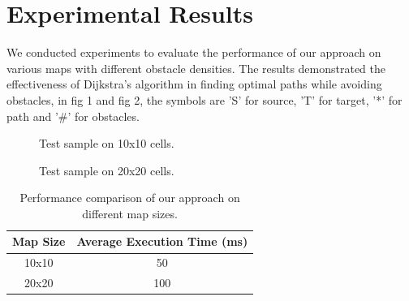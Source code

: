 \documentclass{article}
\begin{document}
\section{Experimental Results}
We conducted experiments to evaluate the performance of our approach on various maps with different obstacle densities. The results demonstrated the effectiveness of Dijkstra's algorithm in finding optimal paths while avoiding obstacles, in fig 1 and fig 2, the symbols are 'S' for source, 'T' for target, '*' for path and '\#' for obstacles.

\begin{figure}[H]
  \centering
  \caption{Test sample on 10x10 cells.}
  \label{fig:example1}
\end{figure}

\begin{figure}[H]
  \centering
  \caption{Test sample on 20x20 cells.}
  \label{fig:example2}
\end{figure}

\begin{table}[H]
  \centering
  \begin{tabular}{|c|c|}
    \hline
    Map Size & Average Execution Time (ms) \\
    \hline
    10x10 & 50 \\
    20x20 & 100 \\
    \hline
  \end{tabular}
  \caption{Performance comparison of our approach on different map sizes.}
  \label{table:performance}
\end{table}
\end{document}
